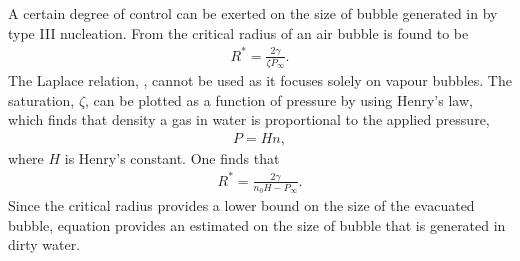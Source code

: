 A certain degree of control can be exerted on the size of bubble generated in by type III nucleation.
From  the critical radius of an air bubble is found to be
\begin{align}
  R^\ast = \frac{2 \gamma}{\zeta P_\infty}.
\label{eqn:nuc:astarTwo}
\end{align}
The Laplace relation, , cannot be used as it  focuses solely on vapour bubbles.
The saturation, $\zeta$, can be plotted as a function of pressure by using Henry's law,
which finds that density a gas in water is proportional to the applied pressure,
\begin{align}
  P = H n,
\end{align}
where $H$ is Henry's constant.  One finds that 
\begin{align}
  \label{eqn:HenrysConst}
  R^\ast = \frac{2\gamma}{n_0H - P_\infty}.
\end{align}
Since the critical radius provides a lower bound on the size of the evacuated bubble,
equation  provides an estimated on the size of bubble that is generated in dirty water.







%

